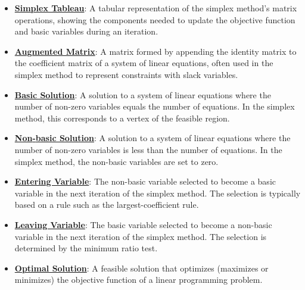 \documentclass{article}%
\begin{document}
\begin{itemize}[leftmargin=*]%
\item \href{https://www.math.purdue.edu/~yipn/421/2024-09-24-SimplexMatrix.pdf#page=10}{\textbf{Simplex Tableau}}: A tabular representation of the simplex method's matrix operations, showing the components needed to update the objective function and basic variables during an iteration.%
\item \href{https://www.math.purdue.edu/~yipn/421/2024-09-24-SimplexMatrix.pdf#page=3}{\textbf{Augmented Matrix}}: A matrix formed by appending the identity matrix to the coefficient matrix of a system of linear equations, often used in the simplex method to represent constraints with slack variables.%
\item \href{https://www.math.purdue.edu/~yipn/421/2024-09-24-SimplexMatrix.pdf#page=4}{\textbf{Basic Solution}}: A solution to a system of linear equations where the number of non-zero variables equals the number of equations. In the simplex method, this corresponds to a vertex of the feasible region.%
\item \href{https://www.math.purdue.edu/~yipn/421/2024-09-24-SimplexMatrix.pdf#page=4}{\textbf{Non{-}basic Solution}}: A solution to a system of linear equations where the number of non-zero variables is less than the number of equations. In the simplex method, the non-basic variables are set to zero.%
\item \href{https://www.math.purdue.edu/~yipn/421/2024-09-24-SimplexMatrix.pdf#page=17}{\textbf{Entering Variable}}: The non-basic variable selected to become a basic variable in the next iteration of the simplex method. The selection is typically based on a rule such as the largest-coefficient rule.%
\item \href{https://www.math.purdue.edu/~yipn/421/2024-09-24-SimplexMatrix.pdf#page=17}{\textbf{Leaving Variable}}: The basic variable selected to become a non-basic variable in the next iteration of the simplex method. The selection is determined by the minimum ratio test.%
\item \href{https://www.math.purdue.edu/~yipn/421/2024-09-24-SimplexMatrix.pdf#page=20}{\textbf{Optimal Solution}}: A feasible solution that optimizes (maximizes or minimizes) the objective function of a linear programming problem.%
\end{itemize}%
\end{document}
